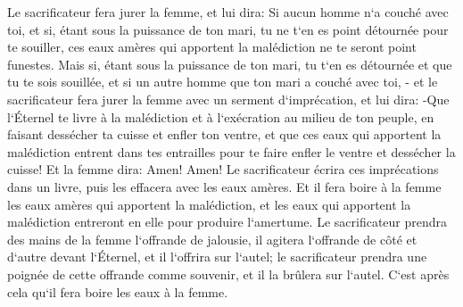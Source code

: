 \verse Le sacrificateur fera jurer la femme, et lui dira: Si aucun homme n`a couché avec toi, et si, étant sous la puissance de ton mari, tu ne t`en es point détournée pour te souiller, ces eaux amères qui apportent la malédiction ne te seront point funestes. 
\verse Mais si, étant sous la puissance de ton mari, tu t`en es détournée et que tu te sois souillée, et si un autre homme que ton mari a couché avec toi, - 
\verse et le sacrificateur fera jurer la femme avec un serment d`imprécation, et lui dira: -Que l`Éternel te livre à la malédiction et à l`exécration au milieu de ton peuple, en faisant dessécher ta cuisse et enfler ton ventre, 
\verse et que ces eaux qui apportent la malédiction entrent dans tes entrailles pour te faire enfler le ventre et dessécher la cuisse! Et la femme dira: Amen! Amen! 
\verse Le sacrificateur écrira ces imprécations dans un livre, puis les effacera avec les eaux amères. 
\verse Et il fera boire à la femme les eaux amères qui apportent la malédiction, et les eaux qui apportent la malédiction entreront en elle pour produire l`amertume. 
\verse Le sacrificateur prendra des mains de la femme l`offrande de jalousie, il agitera l`offrande de côté et d`autre devant l`Éternel, et il l`offrira sur l`autel; 
\verse le sacrificateur prendra une poignée de cette offrande comme souvenir, et il la brûlera sur l`autel. C`est après cela qu`il fera boire les eaux à la femme. 
